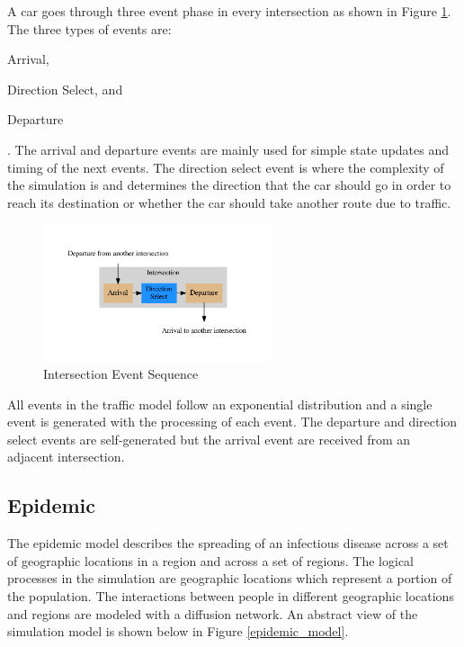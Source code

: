 \documentclass[11pt]{book}
\begin{document}
A car goes through three event phase in every intersection as shown in Figure
\ref{traffic_events}.  The three types of events are: \begin{inparaenum}[(1)] \item Arrival,
\item Direction Select, and \item Departure \end{inparaenum}.  The arrival and departure
events are mainly used for simple state updates and timing of the next events.
The direction select event is where the complexity of the simulation is and determines the
direction that the car should go in order to reach its destination or whether the car should
take another route due to traffic.

\begin{figure}
    \centering
    \includegraphics[width=0.6\textwidth,quiet]{figs/graphviz/traffic_events.pdf}
    \caption{Intersection Event Sequence}\label{traffic_events}
\end{figure}

All events in the traffic model follow an exponential distribution and a single event
is generated with the processing of each event.  The departure and direction select events
are self-generated but the arrival event are received from an adjacent intersection.

\subsection{Epidemic}

The epidemic model describes the spreading of an infectious disease across a set of
geographic locations in a region and across a set of regions.  The logical processes in
the simulation are geographic locations which represent a portion of the population.  The
interactions between people in different geographic locations and regions are modeled with
a diffusion network.  An abstract view of the simulation model is shown below in Figure
\ref{epidemic_model}.
\end{document}
